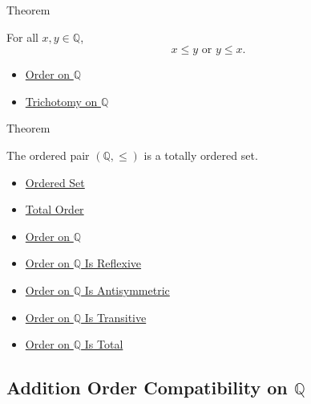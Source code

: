 \begin{theorembox}{Theorem}
\begin{theorem}
\label{thm:order-on-q-total}
For all $x,y\in\mathbb{Q}$,
\[
x\le y\text{ or }y\le x.
\]
\end{theorem}
\end{theorembox}

\begin{dependencies}
\begin{itemize}
  \item \hyperref[def:order-on-q]{Order on $\mathbb{Q}$}
  \item \hyperref[thm:trichotomy-on-q]{Trichotomy on $\mathbb{Q}$}
\end{itemize}
\end{dependencies}

\begin{theorembox}{Theorem}
\begin{theorem}
\label{thm:q-totally-ordered-set}
The ordered pair $(\mathbb{Q},\le)$ is a totally ordered set.
\end{theorem}
\end{theorembox}

\begin{dependencies}
\begin{itemize}
  \item \hyperref[def:ordered-set]{Ordered Set}
  \item \hyperref[def:total-order]{Total Order}
  \item \hyperref[def:order-on-q]{Order on $\mathbb{Q}$}
  \item \hyperref[thm:order-on-q-reflexive]{Order on $\mathbb{Q}$ Is Reflexive}
  \item \hyperref[thm:order-on-q-antisymmetric]{Order on $\mathbb{Q}$ Is Antisymmetric}
  \item \hyperref[thm:order-on-q-transitive]{Order on $\mathbb{Q}$ Is Transitive}
  \item \hyperref[thm:order-on-q-total]{Order on $\mathbb{Q}$ Is Total}
\end{itemize}
\end{dependencies}

\subsection*{\texorpdfstring{Addition Order Compatibility on $\mathbb{Q}$}{Addition Order Compatibility on Q}}

